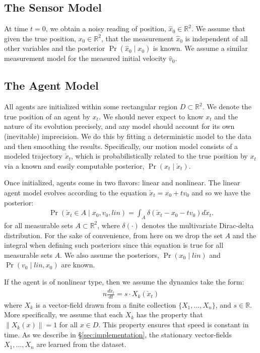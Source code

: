 \documentclass[letterpaper,10pt,conference]{ieeetran}
\begin{document}
\subsection{The Sensor Model}
At time $t=0$, we obtain a noisy reading of position, $\hat{x}_0 \in \mathbb{R}^2$.
We assume that given the true position, $x_0 \in \mathbb{R}^2$, that the measurement $\hat{x}_0$ is independent of all other variables and the posterior $\Pr( \hat{x}_0 \mid x_0)$ is known.
We assume a similar measurement model for the measured initial velocity $\hat{v}_0$.

\subsection{The Agent Model}
All agents are initialized within some rectangular region $D \subset \mathbb{R}^2$.
We denote the true position of an agent by $x_t$.
We should never expect to know $x_t$ and the nature of its evolution precisely, and any model should account for its own (inevitable) imprecision.
We do this by fitting a deterministic model to the data and then smoothing the results.
Specifically, our motion model consists of a modeled trajectory $\check{x}_t$, which is probabilistically related to the true position by $x_t$ via a known and easily computable posterior, $\Pr(x_t \mid \check{x}_t)$.

Once initialized, agents come in two flavors: linear and nonlinear.
The linear agent model evolves according to the equation $\check{x}_t = x_0 + t v_0$ and so we have the posterior:
\begin{align}
	\Pr( \check{x}_t  \in A \mid x_0, v_0, lin) = \int_A \delta( \check{x}_t - x_0 - t v_0 ) d\check{x}_t.
\end{align}
for all measurable sets $A \subset \mathbb{R}^2$, where $\delta( \cdot )$ denotes the multivariate Dirac-delta distribution.
For the sake of convenience, from here on we drop the set $A$ and the integral when defining such posteriors since this equation is true for all measurable sets $A$.
We also assume the posteriors, $\Pr(x_0 \mid lin)$ and $\Pr( v_0 \mid lin, x_0)$ are known.

If the agent is of nonlinear type, then we assume the dynamics take the form:
\begin{align}n
	\frac{d \check{x}_t}{dt} = s \cdot X_k(\check{x}_t) \label{eq:ode}
\end{align}
where $X_k$ is a vector-field drawn from a finite collection $\{X_1, \dots, X_n\}$, and $s \in \mathbb{R}$.
More specifically, we assume that each $X_k$ has the property that $\| X_k(x) \| = 1$ for all $x \in D$.
This property ensures that speed is constant in time.
As we describe in \S \ref{sec:implementation}, the stationary vector-fields $X_1,\dots,X_n$ are learned from the dataset.
\end{document}
